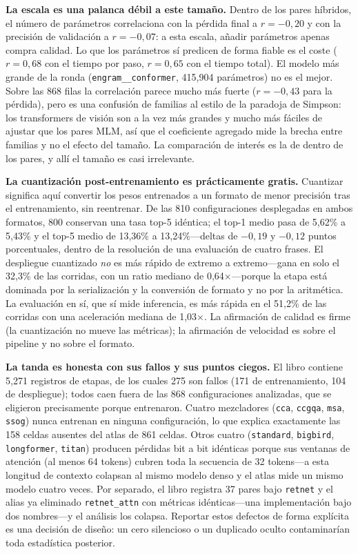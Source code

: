 \textbf{La escala es una palanca débil a este tamaño.} Dentro de los pares híbridos, el número de parámetros correlaciona con la pérdida final a $r = -0{,}20$ y con la precisión de validación a $r = -0{,}07$: a esta escala, añadir parámetros apenas compra calidad. Lo que los parámetros sí predicen de forma fiable es el coste ($r = 0{,}68$ con el tiempo por paso, $r = 0{,}65$ con el tiempo total). El modelo más grande de la ronda (\texttt{engram\_\_conformer}, 415{,}904 parámetros) no es el mejor. Sobre las 868 filas la correlación parece mucho más fuerte ($r = -0{,}43$ para la pérdida), pero es una confusión de familias al estilo de la paradoja de Simpson: los transformers de visión son a la vez más grandes y mucho más fáciles de ajustar que los pares MLM, así que el coeficiente agregado mide la brecha entre familias y no el efecto del tamaño. La comparación de interés es la de dentro de los pares, y allí el tamaño es casi irrelevante.

\textbf{La cuantización post-entrenamiento es prácticamente gratis.} Cuantizar significa aquí convertir los pesos entrenados a un formato de menor precisión tras el entrenamiento, sin reentrenar. De las 810 configuraciones desplegadas en ambos formatos, 800 conservan una tasa top-5 idéntica; el top-1 medio pasa de 5,62\% a 5,43\% y el top-5 medio de 13,36\% a 13,24\%---deltas de $-0{,}19$ y $-0{,}12$ puntos porcentuales, dentro de la resolución de una evaluación de cuatro frases. El despliegue cuantizado \emph{no} es más rápido de extremo a extremo---gana en solo el 32,3\% de las corridas, con un ratio mediano de 0,64$\times$---porque la etapa está dominada por la serialización y la conversión de formato y no por la aritmética. La evaluación en sí, que sí mide inferencia, es más rápida en el 51,2\% de las corridas con una aceleración mediana de 1,03$\times$. La afirmación de calidad es firme (la cuantización no mueve las métricas); la afirmación de velocidad es sobre el pipeline y no sobre el formato.

\textbf{La tanda es honesta con sus fallos y sus puntos ciegos.} El libro contiene 5{,}271 registros de etapas, de los cuales 275 son fallos (171 de entrenamiento, 104 de despliegue); todos caen fuera de las 868 configuraciones analizadas, que se eligieron precisamente porque entrenaron. Cuatro mezcladores (\texttt{cca}, \texttt{ccgqa}, \texttt{msa}, \texttt{ssog}) nunca entrenan en ninguna configuración, lo que explica exactamente las 158 celdas ausentes del atlas de 861 celdas. Otros cuatro (\texttt{standard}, \texttt{bigbird}, \texttt{longformer}, \texttt{titan}) producen pérdidas bit a bit idénticas porque sus ventanas de atención (al menos 64 tokens) cubren toda la secuencia de 32 tokens---a esta longitud de contexto colapsan al mismo modelo denso y el atlas mide un mismo modelo cuatro veces. Por separado, el libro registra 37 pares bajo \texttt{retnet} y el alias ya eliminado \texttt{retnet\_attn} con métricas idénticas---una implementación bajo dos nombres---y el análisis los colapsa. Reportar estos defectos de forma explícita es una decisión de diseño: un cero silencioso o un duplicado oculto contaminarían toda estadística posterior.

